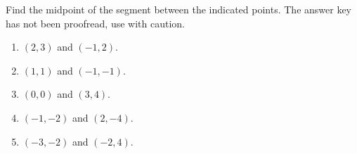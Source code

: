 Find the midpoint of the segment between the indicated points. The answer key has not been proofread, use with caution.
\begin{multicols}{2}
\begin{enumerate}[ref={\fcProblemRef}]
\item $(2,3)$ and $(-1, 2)$.

\item $(1,1)$ and $(-1, -1)$.

\item $(0,0)$ and $(3, 4)$.

\item $(-1,-2)$ and $(2, -4)$.

\item $(-3,-2)$ and $(-2, 4)$.

\end{enumerate}
\end{multicols}